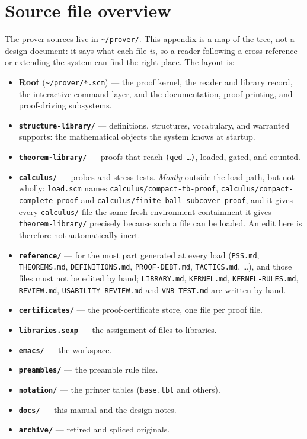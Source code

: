\chapter{Source file overview}
\label{app:source}

The prover sources live in \texttt{\textasciitilde/prover/}.  This appendix is a
map of the tree, not a design document: it says what each file \emph{is}, so a
reader following a cross-reference or extending the system can find the right
place.  The layout is:

\begin{itemize}
\item \textbf{Root} (\texttt{\textasciitilde/prover/*.scm}) --- the proof
  kernel, the reader and library record, the interactive command layer, and the
  documentation, proof-printing, and proof-driving subsystems.
\item \textbf{\texttt{structure-library/}} --- definitions, structures,
  vocabulary, and warranted supports: the mathematical objects the system knows
  at startup.
\item \textbf{\texttt{theorem-library/}} --- proofs that reach \texttt{(qed
  \ldots)}, loaded, gated, and counted.
\item \textbf{\texttt{calculus/}} --- probes and stress tests.  \emph{Mostly}
  outside the load path, but not wholly: \texttt{load.scm} names
  \texttt{calculus/compact-tb-proof},
  \texttt{calculus/compact-complete-proof} and
  \texttt{calculus/finite-ball-subcover-proof}, and it gives every
  \texttt{calculus/} file the same fresh-environment containment it gives
  \texttt{theorem-library/} precisely because such a file can be loaded.  An
  edit here is therefore not automatically inert.
\item \textbf{\texttt{reference/}} --- for the most part generated at every
  load (\texttt{PSS.md}, \texttt{THEOREMS.md}, \texttt{DEFINITIONS.md},
  \texttt{PROOF-DEBT.md}, \texttt{TACTICS.md}, \ldots), and those files must
  not be edited by hand; \texttt{LIBRARY.md}, \texttt{KERNEL.md},
  \texttt{KERNEL-RULES.md}, \texttt{REVIEW.md}, \texttt{USABILITY-REVIEW.md}
  and \texttt{VNB-TEST.md} are written by hand.
\item \textbf{\texttt{certificates/}} --- the proof-certificate store, one
  file per proof file.
\item \textbf{\texttt{libraries.sexp}} --- the assignment of files to
  libraries.
\item \textbf{\texttt{emacs/}} --- the workspace.
\item \textbf{\texttt{preambles/}} --- the preamble rule files.
\item \textbf{\texttt{notation/}} --- the printer tables (\texttt{base.tbl} and others).
\item \textbf{\texttt{docs/}} --- this manual and the design notes.
\item \textbf{\texttt{archive/}} --- retired and spliced originals.
\end{itemize}

